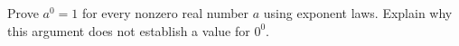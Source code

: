 Prove $a^0=1$ for every nonzero real number $a$ using exponent laws. Explain why this argument does not establish a value for $0^0$.
